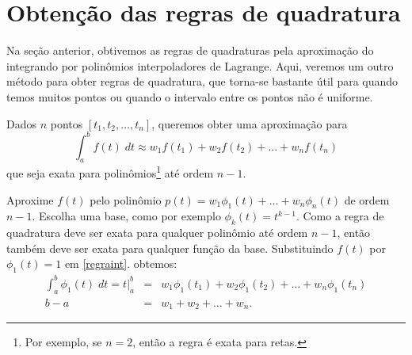 \section{Obtenção das regras de quadratura}

Na seção anterior, obtivemos as regras de quadraturas pela aproximação do integrando por polinômios interpoladores de Lagrange. Aqui, veremos um outro método para obter regras de quadratura, que torna-se bastante útil para quando temos muitos pontos ou quando o intervalo entre os pontos não é uniforme.

Dados $n$ pontos $[t_1, t_2, \ldots,t_n]$, queremos obter uma aproximação para
\begin{equation}\label{regraint}
  \int _a^b f(t) \;dt \approx w_1f(t_1)+w_2f(t_2)+\ldots +w_nf(t_n)
\end{equation}
que seja exata para polinômios\footnote{Por exemplo, se $n=2$, então a regra é exata para retas.} até ordem  $n-1$.

Aproxime $f(t)$ pelo polinômio $p(t)=w_1\phi_1(t)+\ldots +w_n \phi_n(t)$ de ordem $n-1$. Escolha uma base, como por exemplo $\phi _k(t)=t^{k-1}$. Como a regra de quadratura deve ser exata para qualquer polinômio até ordem $n-1$, então também deve ser exata para qualquer função da base. Substituindo $f(t)$ por $\phi _1(t)=1$ em \eqref{regraint}. obtemos:
\begin{eqnarray}
\int _a^b \phi_1(t) \; dt = t|_a^b &=&  w_1\phi _1(t_1)+w_2\phi _1(t_2)+\ldots +w_n\phi_1(t_n) \\
                              b-a  &=&  w_1+w_2+\ldots +w_n.
\end{eqnarray}

